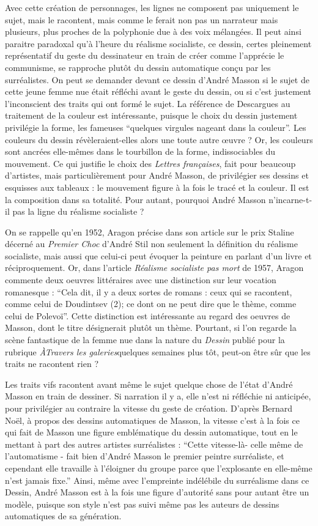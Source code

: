 	Avec cette création de personnages, les lignes ne composent pas uniquement le sujet, mais le racontent, mais comme le ferait non pas un narrateur mais plusieurs, plus proches de la polyphonie due à des voix mélangées. Il peut ainsi paraitre paradoxal qu’à l’heure du réalisme socialiste, ce dessin, certes pleinement représentatif du geste du dessinateur en train de créer comme l’apprécie le communisme, se rapproche plutôt du dessin automatique conçu par les surréalistes. On peut se demander devant ce dessin d’André Masson si le sujet de cette jeune femme nue était réfléchi avant le geste du dessin, ou si c’est justement l’inconscient des traits qui ont formé le sujet. La référence de Descargues au traitement de la couleur est intéressante, puisque le choix du dessin justement privilégie la forme, les fameuses \enquote{quelques virgules nageant dans la couleur}. Les couleurs du dessin révèleraient-elles alors une toute autre \oe{}uvre ? Or, les couleurs sont ancrées elle-mêmes dans le tourbillon de la forme, indissociables du mouvement. Ce qui justifie le choix des \emph{Lettres françaises}, fait pour beaucoup d’artistes, mais particulièrement pour André Masson, de privilégier ses dessins et esquisses aux tableaux : le mouvement figure à la fois le tracé et la couleur. Il est la composition dans sa totalité. Pour autant, pourquoi André Masson n’incarne-t-il pas  la ligne du réalisme socialiste ? 


On se rappelle qu’en 1952, Aragon précise dans son article sur le prix Staline décerné au \emph{Premier Choc} d’André Stil non seulement la définition du réalisme socialiste, mais aussi que celui-ci peut évoquer la peinture en parlant d’un livre et réciproquement. Or, dans l’article \emph{Réalisme socialiste pas mort} de 1957, Aragon commente deux oeuvres littéraires avec une distinction sur leur vocation romanesque : \enquote{Cela dit, il y a deux sortes de romans : ceux qui se racontent, comme celui de Doudintsev (2); ce dont on ne peut dire que le thème, comme celui de Polevoï}. Cette distinction est intéressante au regard des oeuvres de Masson, dont le titre désignerait plutôt un thème. Pourtant, si l'on regarde la scène fantastique de la femme nue dans la nature du \emph{Dessin }publié pour la rubrique \emph{ÀTravers les galeries}quelques semaines plus tôt, peut-on être sûr que les traits ne racontent rien ? 

	Les traits vifs racontent avant même le sujet quelque chose de l’état d’André Masson en train de dessiner. Si narration il y a, elle n’est ni réfléchie ni anticipée, pour privilégier au contraire la vitesse du geste de création. D’après Bernard Noël, à propos des dessins automatiques de Masson, la vitesse c’est à la fois ce qui fait de Masson une figure emblématique du dessin automatique, tout en le mettant à part des autres artistes surréalistes : \enquote{Cette vitesse-là- celle même de l’automatisme - fait bien d’André Masson le premier peintre surréaliste, et cependant elle travaille à l’éloigner du groupe parce que l’explosante en elle-même n’est jamais fixe.} Ainsi, même avec l’empreinte indélébile du surréalisme dans ce Dessin, André Masson est à la fois une figure d’autorité sans pour autant être un modèle, puisque son style n’est pas suivi même pas les auteurs de dessins automatiques de sa génération. 

